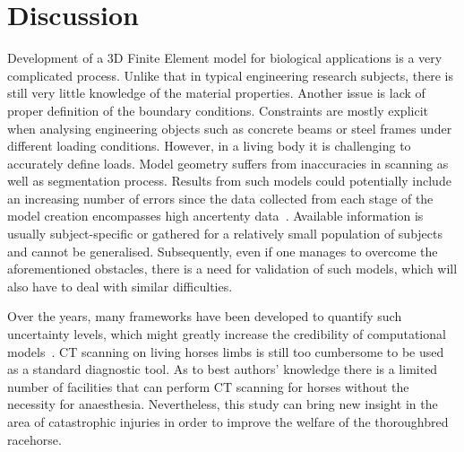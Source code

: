 \documentclass[11pt]{acmeArticle}
\numberwithin{equation}{section}
\begin{document}

\section{Discussion}\label{sec:discussion}
Development of a 3D Finite Element model for biological applications is a very complicated process. 
Unlike that in typical engineering research subjects, there is still very little knowledge of the material properties. 
Another issue is lack of proper definition of the boundary conditions. Constraints are mostly explicit when analysing engineering objects such as concrete beams or steel frames under different loading conditions. 
However, in a living body it is challenging to accurately define loads. 
Model geometry suffers from inaccuracies in scanning as well as segmentation process. 
Results from such models could potentially include an increasing number of errors since the data collected from each stage of the 
model creation encompasses high ancertenty data~\citep{campoli2014effects}.
Available information is usually subject-specific or gathered for a relatively small population of subjects and cannot be generalised. 
Subsequently, even if one manages to overcome the aforementioned obstacles, there is a need for validation of such models, which will also have to deal with similar difficulties. 

Over the years, many frameworks have been developed to quantify such uncertainty levels, which might greatly increase the credibility of computational models~\citep{wille2016uncertainty}. 
CT scanning on living horses limbs is still too cumbersome to be used as a standard diagnostic tool.
As to best authors' knowledge there is a limited number of facilities that can perform CT scanning for horses without the necessity for anaesthesia. 
Nevertheless, this study can bring new insight in the area of catastrophic injuries in order to improve the welfare of the thoroughbred racehorse. %
\end{document}
